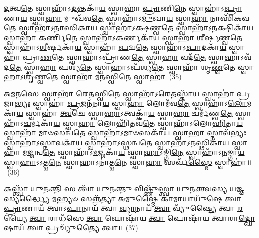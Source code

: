 {%
{\anuvakamend[{\-\ul{𑌸𑌂} 𑌵𑌰𑍍\mbox{}𑌷᳴\-\ul{𑌤𑍇} 𑌰𑍈𑌭𑍀॑\-\ul{𑌭𑍍𑌯𑌃} 𑌸𑍍𑌵𑌾\-\ul{𑌹𑌾} 𑌦𑍍𑌵𑍇 𑌚᳴}]}%

\-\ul{𑌦}\-𑌤𑍍𑌵\-\ul{𑌤𑍇} 𑌸𑍍𑌵𑌾𑌹𑌾᳴\-𑌽\-\ul{𑌦}\-𑌨𑍍𑌤𑌕𑌾᳴\-\ul{𑌯} 𑌸𑍍𑌵𑌾𑌹𑌾॑ \ul{𑌪𑍍𑌰𑌾}\-𑌣𑌿\-\ul{𑌨𑍇} 𑌸𑍍𑌵𑌾𑌹𑌾॑\-𑌽\-\ul{𑌪𑍍𑌰𑌾}\-𑌣𑌾\-\ul{𑌯} 𑌸𑍍𑌵𑌾\-\ul{𑌹𑌾} 𑌮𑍁𑌖᳴𑌵\-\ul{𑌤𑍇} 𑌸𑍍𑌵𑌾𑌹𑌾᳴\-𑌽\-\ul{𑌮𑍁}\-𑌖𑌾\-\ul{𑌯} 𑌸𑍍𑌵𑌾\-\ul{𑌹𑌾} 𑌨𑌾𑌸𑌿᳴𑌕𑌵\-\ul{𑌤𑍇} 𑌸𑍍𑌵𑌾𑌹𑌾᳴\-𑌽𑌨𑌾\-\ul{𑌸𑌿}\-𑌕𑌾\-\ul{𑌯} 𑌸𑍍𑌵𑌾𑌹𑌾॑\-𑌽\-\ul{𑌕𑍍𑌷}\-𑌣𑍍𑌵\-\ul{𑌤𑍇} 𑌸𑍍𑌵𑌾𑌹𑌾᳴\-𑌽\-\ul{𑌨}\-𑌕𑍍𑌷𑌿𑌕𑌾᳴\-\ul{𑌯} 𑌸𑍍𑌵𑌾𑌹𑌾᳴ \ul{𑌕}\-𑌰𑍍𑌣𑌿\-\ul{𑌨𑍇} 𑌸𑍍𑌵𑌾𑌹𑌾᳴\-𑌽\-\ul{𑌕}\-𑌰𑍍𑌣𑌕𑌾᳴\-\ul{𑌯} 𑌸𑍍𑌵𑌾𑌹𑌾᳴ 𑌶𑍀𑌰𑍍\mbox{}\-\ul{𑌷}\-𑌣𑍍𑌵\-\ul{𑌤𑍇} 𑌸𑍍𑌵𑌾𑌹𑌾᳴\-𑌽\-\-\ul{𑌶𑍀}\-𑌰𑍍\mbox{}𑌷𑌕𑌾᳴\-\ul{𑌯} 𑌸𑍍𑌵𑌾𑌹𑌾᳴ \ul{𑌪}\-𑌦𑍍𑌵\-\ul{𑌤𑍇} 𑌸𑍍𑌵𑌾𑌹𑌾᳴\-𑌽\-\ul{𑌪𑌾}\-𑌦𑌕𑌾᳴\-\ul{𑌯} 𑌸𑍍𑌵𑌾𑌹𑌾॑ 𑌪𑍍𑌰𑌾\-\ul{𑌣}\-𑌤𑍇 𑌸𑍍𑌵𑌾𑌹𑌾\-𑌽𑌪𑍍𑌰𑌾᳴𑌣\-\ul{𑌤𑍇} 𑌸𑍍𑌵𑌾\-\ul{𑌹𑌾} 𑌵𑌦᳴\-\ul{𑌤𑍇} 𑌸𑍍𑌵𑌾𑌹𑌾\-𑌽𑌵᳴𑌦\-\ul{𑌤𑍇} 𑌸𑍍𑌵𑌾\-\ul{𑌹𑌾} 𑌪𑌶𑍍𑌯᳴\-\ul{𑌤𑍇} 𑌸𑍍𑌵𑌾𑌹𑌾\-𑌽𑌪᳴𑌶𑍍𑌯\-\ul{𑌤𑍇} 𑌸𑍍𑌵𑌾𑌹𑌾᳴ 𑌶𑍃\-\ul{𑌣𑍍𑌵}\-𑌤𑍇 𑌸𑍍𑌵𑌾𑌹𑌾\-𑌽𑌶𑍃᳴𑌣𑍍𑌵\-\ul{𑌤𑍇} 𑌸𑍍𑌵𑌾𑌹𑌾᳴ 𑌮\-\ul{𑌨}\-𑌸𑍍𑌵𑌿\-\ul{𑌨𑍇} 𑌸𑍍𑌵𑌾𑌹𑌾॑~(35)

\-\ul{𑌅}\-\-\ul{𑌮}\-𑌨\-\ul{𑌸𑍇} 𑌸𑍍𑌵𑌾𑌹𑌾᳴ 𑌰𑍇\-\ul{𑌤}\-𑌸𑍍𑌵𑌿\-\ul{𑌨𑍇} 𑌸𑍍𑌵𑌾𑌹𑌾᳴\-𑌽\-\ul{𑌰𑍇}\-𑌤𑌸𑍍𑌕𑌾᳴\-\ul{𑌯} 𑌸𑍍𑌵𑌾𑌹𑌾॑ \ul{𑌪𑍍𑌰}\-𑌜𑌾\-\ul{𑌭𑍍𑌯𑌃} 𑌸𑍍𑌵𑌾𑌹𑌾॑ \ul{𑌪𑍍𑌰}\-𑌜𑌨᳴𑌨𑌾\-\ul{𑌯} 𑌸𑍍𑌵𑌾\-\ul{𑌹𑌾} 𑌲𑍋𑌮᳴𑌵\-\ul{𑌤𑍇} 𑌸𑍍𑌵𑌾𑌹𑌾᳴\-𑌽\-\ul{𑌲𑍋}\-𑌮𑌕𑌾᳴\-\ul{𑌯} 𑌸𑍍𑌵𑌾𑌹𑌾॑ \ul{𑌤𑍍𑌵}\-𑌚𑍇 𑌸𑍍𑌵𑌾\-\ul{𑌹𑌾}\-\-𑌽𑌤𑍍𑌵𑌕𑍍𑌕𑌾᳴\-\ul{𑌯} 𑌸𑍍𑌵𑌾\-\ul{𑌹𑌾} 𑌚𑌰𑍍𑌮᳴𑌣𑍍𑌵\-\ul{𑌤𑍇} 𑌸𑍍𑌵𑌾𑌹𑌾᳴\-𑌽\-\ul{𑌚}\-𑌰𑍍𑌮𑌕𑌾᳴\-\ul{𑌯} 𑌸𑍍𑌵𑌾\-\ul{𑌹𑌾} 𑌲𑍋𑌹𑌿᳴𑌤𑌵\-\ul{𑌤𑍇} 𑌸𑍍𑌵𑌾𑌹𑌾᳴\-𑌽𑌲𑍋\-\ul{𑌹𑌿}\-𑌤𑌾\-\ul{𑌯} 𑌸𑍍𑌵𑌾𑌹𑌾᳴ 𑌮𑌾𑍞\-\ul{𑌸}\-𑌨𑍍𑌵\-\ul{𑌤𑍇} 𑌸𑍍𑌵𑌾𑌹𑌾᳴\-𑌽\-\ul{𑌮𑌾}\-\-\ul{𑍞}\-𑌸𑌕𑌾᳴\-\ul{𑌯} 𑌸𑍍𑌵𑌾\-\ul{𑌹𑌾} 𑌸𑍍𑌨𑌾𑌵᳴\-\ul{𑌭𑍍𑌯𑌃} 𑌸𑍍𑌵𑌾𑌹𑌾॑\-𑌽\-\ul{𑌸𑍍𑌨𑌾}\-𑌵𑌕𑌾᳴\-\ul{𑌯} 𑌸𑍍𑌵𑌾𑌹𑌾॑\-𑌽\-\ul{𑌸𑍍𑌥}\-𑌨𑍍𑌵\-\ul{𑌤𑍇} 𑌸𑍍𑌵𑌾𑌹𑌾᳴\-𑌽\-\ul{𑌨}\-𑌸𑍍𑌥𑌿𑌕𑌾᳴\-\ul{𑌯} 𑌸𑍍𑌵𑌾𑌹𑌾᳴ 𑌮\-\ul{𑌜𑍍𑌜}\-𑌨𑍍𑌵\-\ul{𑌤𑍇} 𑌸𑍍𑌵𑌾𑌹𑌾᳴\-𑌽\-\ul{𑌮}\-𑌜𑍍𑌜𑌕𑌾᳴\-\ul{𑌯} 𑌸𑍍𑌵𑌾\-\ul{𑌹𑌾}\-\-𑌽𑌙𑍍𑌗𑌿\-\ul{𑌨𑍇} 𑌸𑍍𑌵𑌾𑌹𑌾᳴\-𑌽\-\ul{𑌨}\-𑌙𑍍𑌗𑌾\-\ul{𑌯} 𑌸𑍍𑌵𑌾\-\ul{𑌹𑌾}\-\-𑌽\-𑌽𑌤𑍍𑌮\-\ul{𑌨𑍇} 𑌸𑍍𑌵𑌾𑌹𑌾\-𑌽𑌨𑌾॑𑌤𑍍𑌮\-\ul{𑌨𑍇} 𑌸𑍍𑌵𑌾\-\ul{𑌹𑌾} 𑌸𑌰𑍍𑌵᳴\-\ul{𑌸𑍍𑌮𑍈} 𑌸𑍍𑌵𑌾𑌹𑌾॑॥~(36)

{\anuvakamend[{\-\ul{𑌮}\-\-\ul{𑌨}\-𑌸𑍍𑌵𑌿\-\ul{𑌨𑍇} 𑌸𑍍𑌵𑌾𑌹𑌾\-𑌽𑌨𑌾॑𑌤𑍍𑌮\-\ul{𑌨𑍇} 𑌸𑍍𑌵𑌾\-\ul{𑌹𑌾} 𑌦𑍍𑌵𑍇 𑌚᳴}]}%

𑌕𑌸𑍍𑌤𑍍𑌵𑌾᳴ 𑌯𑍁𑌨\-\ul{𑌕𑍍𑌤𑌿} 𑌸 𑌤𑍍𑌵𑌾᳴ 𑌯𑍁𑌨\-\ul{𑌕𑍍𑌤𑍁} 𑌵𑌿𑌷𑍍𑌣𑍁᳴𑌸𑍍𑌤𑍍𑌵𑌾 𑌯𑍁𑌨\-\ul{𑌕𑍍𑌤𑍍𑌵}\-𑌸𑍍𑌯 \ul{𑌯}\-𑌜𑍍𑌞𑌸𑍍𑌯\-\ul{𑌰𑍍𑌦𑍍𑌧𑍍𑌯𑍈} 𑌮\-\ul{𑌹𑍍𑌯}\-\-\ul{𑍞} 𑌸𑌨𑍍𑌨᳴𑌤𑍍𑌯𑌾 \ul{𑌅}\-𑌮𑍁\-\ul{𑌷𑍍𑌮𑍈} 𑌕𑌾\-\ul{𑌮𑌾}\-𑌯𑌾𑌯𑍁᳴𑌷𑍇 𑌤𑍍𑌵𑌾 \ul{𑌪𑍍𑌰𑌾}\-𑌣𑌾𑌯᳴ 𑌤𑍍𑌵𑌾\-𑌽\-\ul{𑌪𑌾}\-𑌨𑌾𑌯᳴ 𑌤𑍍𑌵𑌾 \ul{𑌵𑍍𑌯𑌾}\-𑌨𑌾𑌯᳴ \ul{𑌤𑍍𑌵𑌾} 𑌵𑍍𑌯𑍁᳴𑌷𑍍𑌟𑍍𑌯𑍈 𑌤𑍍𑌵𑌾 \ul{𑌰}\-𑌯𑍍𑌯𑍈 \ul{𑌤𑍍𑌵𑌾} 𑌰𑌾𑌧᳴𑌸𑍇 \ul{𑌤𑍍𑌵𑌾} 𑌘𑍋𑌷𑌾᳴𑌯 \ul{𑌤𑍍𑌵𑌾} 𑌪𑍋𑌷𑌾᳴𑌯 𑌤𑍍𑌵𑌾𑌰𑌾\-\ul{𑌦𑍍𑌘𑍋}\-𑌷𑌾𑌯᳴ \ul{𑌤𑍍𑌵𑌾} 𑌪𑍍𑌰𑌚𑍍𑌯𑍁᳴𑌤𑍍𑌯𑍈 𑌤𑍍𑌵𑌾॥~(37)

{\anuvakamend[{𑌕\-\ul{𑌸𑍍𑌤𑍍𑌵𑌾}\-\-𑌽𑌷𑍍𑌟𑌾𑌤𑍍𑌰𑌿𑍞᳴𑌶𑌤𑍍}]}%

}
